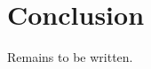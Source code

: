 \documentclass[10pt,letterpaper]{article}\usepackage[]{graphicx}\usepackage[]{color}
\begin{document}





\section*{Conclusion}
Remains to be written.
\end{document}
